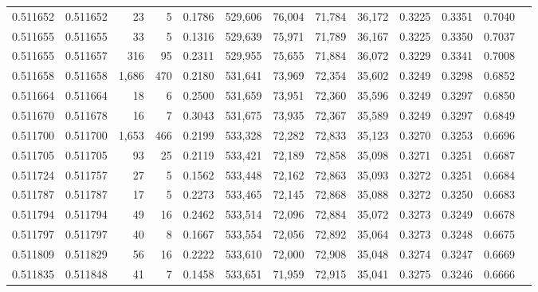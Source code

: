 \begin{tabular}{rrrrrrrrrrrrr}
0.511652 & 0.511652 &    23 &     5 &                                     0.1786 & 529,606 &  76,004 &  71,784 &  36,172 & 0.3225 & 0.3351 & 0.7040 \\
0.511655 & 0.511655 &    33 &     5 &                                     0.1316 & 529,639 &  75,971 &  71,789 &  36,167 & 0.3225 & 0.3350 & 0.7037 \\
0.511655 & 0.511657 &   316 &    95 &                                     0.2311 & 529,955 &  75,655 &  71,884 &  36,072 & 0.3229 & 0.3341 & 0.7008 \\
0.511658 & 0.511658 & 1,686 &   470 &                                     0.2180 & 531,641 &  73,969 &  72,354 &  35,602 & 0.3249 & 0.3298 & 0.6852 \\
0.511664 & 0.511664 &    18 &     6 &                                     0.2500 & 531,659 &  73,951 &  72,360 &  35,596 & 0.3249 & 0.3297 & 0.6850 \\
0.511670 & 0.511678 &    16 &     7 &                                     0.3043 & 531,675 &  73,935 &  72,367 &  35,589 & 0.3249 & 0.3297 & 0.6849 \\
0.511700 & 0.511700 & 1,653 &   466 &                                     0.2199 & 533,328 &  72,282 &  72,833 &  35,123 & 0.3270 & 0.3253 & 0.6696 \\
0.511705 & 0.511705 &    93 &    25 &                                     0.2119 & 533,421 &  72,189 &  72,858 &  35,098 & 0.3271 & 0.3251 & 0.6687 \\
0.511724 & 0.511757 &    27 &     5 &                                     0.1562 & 533,448 &  72,162 &  72,863 &  35,093 & 0.3272 & 0.3251 & 0.6684 \\
0.511787 & 0.511787 &    17 &     5 &                                     0.2273 & 533,465 &  72,145 &  72,868 &  35,088 & 0.3272 & 0.3250 & 0.6683 \\
0.511794 & 0.511794 &    49 &    16 &                                     0.2462 & 533,514 &  72,096 &  72,884 &  35,072 & 0.3273 & 0.3249 & 0.6678 \\
0.511797 & 0.511797 &    40 &     8 &                                     0.1667 & 533,554 &  72,056 &  72,892 &  35,064 & 0.3273 & 0.3248 & 0.6675 \\
0.511809 & 0.511829 &    56 &    16 &                                     0.2222 & 533,610 &  72,000 &  72,908 &  35,048 & 0.3274 & 0.3247 & 0.6669 \\
0.511835 & 0.511848 &    41 &     7 &                                     0.1458 & 533,651 &  71,959 &  72,915 &  35,041 & 0.3275 & 0.3246 & 0.6666 \\

\end{tabular}
